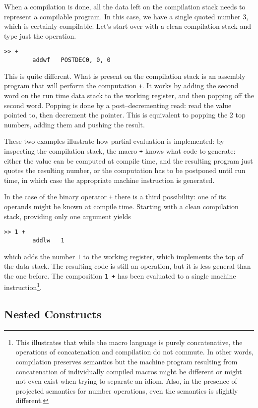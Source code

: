 \documentclass[12pt]{article}
\begin{document}
When a compilation is done, all the data left on the compilation stack
needs to represent a compilable program. In this case, we have a
single quoted number $3$, which is certainly compilable. Let's start
over with a clean compilation stack and type just the operation.
\begin{verbatim}
>> +
        addwf   POSTDEC0, 0, 0
\end{verbatim}
This is quite different. What is present on the compilation stack is
an assembly program that will perform the computation \verb|+|. It
works by adding the second word on the run time data stack to the
working register, and then popping off the second word. Popping is
done by a post--decrementing read: read the value pointed to, then
decrement the pointer. This is equivalent to popping the 2 top
numbers, adding them and pushing the result.

These two examples illustrate how partial evaluation is implemented:
by inspecting the compilation stack, the macro \verb|+| knows what
code to generate: either the value can be computed at compile
time, and the resulting program just quotes the resulting number, or
the computation has to be postponed until run time, in which case the
appropriate machine instruction is generated. 

In the case of the binary operator \verb|+| there is a third
possibility: one of its operands might be known at compile
time. Starting with a clean compilation stack, providing only one
argument yields
\begin{verbatim}
>> 1 +
        addlw   1
\end{verbatim}
which adds the number $1$ to the working register, which implements
the top of the data stack. The resulting code is still an operation,
but it is less general than the one before. The composition \verb|1 +|
has been evaluated to a single machine instruction\footnote{This
  illustrates that while the macro language is purely concatenative,
  the operations of concatenation and compilation do not commute. In
  other words, compilation preserves semantics but the machine program
  resulting from concatenation of individually compiled macros might
  be different or might not even exist when trying to separate an
  idiom. Also, in the presence of projected semantics for number
  operations, even the semantics is slightly different.}.


\subsection{Nested Constructs}
\end{document}
